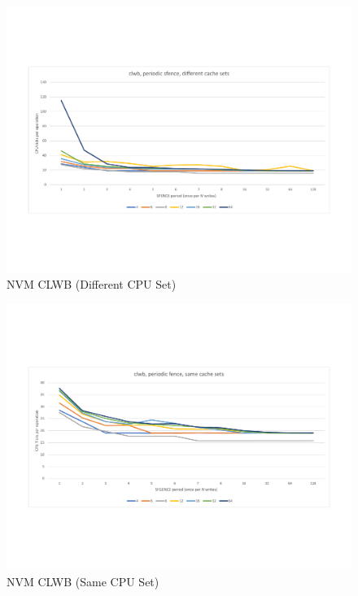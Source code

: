 \begin{figure}
    \centering
    \caption{NVM CLWB (Different CPU Set)}\label{micro:clwb:different}
    \includegraphics[scale=0.35]{micro/nvm-clwb-periodic-different.pdf}
\end{figure}

\begin{figure}
    \centering
    \caption{NVM CLWB (Same CPU Set)}\label{micro:clwb:same}
    \includegraphics[scale=0.35]{micro/nvm-clwb-periodic-same.pdf}
\end{figure}

